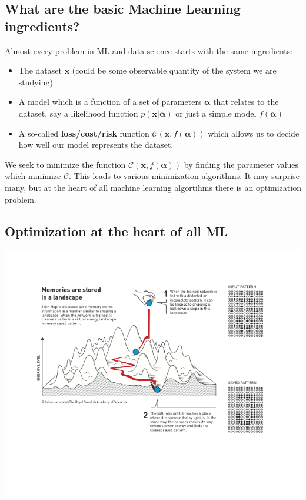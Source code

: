 \documentclass[%
oneside,                 %
final,                   %
10pt]{article}
\begin{document}
\subsection{What are the basic Machine Learning ingredients?}
\begin{block}{}
Almost every problem in ML and data science starts with the same ingredients:
\begin{itemize}
\item The dataset $\bm{x}$ (could be some observable quantity of the system we are studying)

\item A model which is a function of a set of parameters $\bm{\alpha}$ that relates to the dataset, say a likelihood  function $p(\bm{x}\vert \bm{\alpha})$ or just a simple model $f(\bm{\alpha})$

\item A so-called \textbf{loss/cost/risk} function $\mathcal{C} (\bm{x}, f(\bm{\alpha}))$ which allows us to decide how well our model represents the dataset. 
\end{itemize}

\noindent
We seek to minimize the function $\mathcal{C} (\bm{x}, f(\bm{\alpha}))$ by finding the parameter values which minimize $\mathcal{C}$. This leads to  various minimization algorithms. It may surprise many, but at the heart of all machine learning algortihms there is an optimization problem. 
\end{block}

\subsection{Optimization at the heart of all ML}

\vspace{6mm}

\centerline{\includegraphics[width=1.0\linewidth]{figures/optimization.png}}
\end{document}
